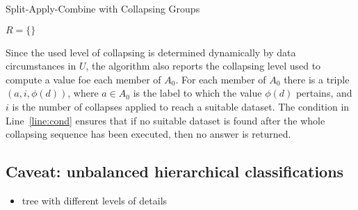\documentclass[11pt, fleqn]{article}
\begin{document}
%
\begin{algorithm}[H]
\caption{Split-Apply-Combine with Collapsing Groups}
\label{alg:saccg}


$R = \{\}$\;

\end{algorithm}
%
Since the used level of collapsing is determined dynamically by data
circumstances in $U$, the algorithm also reports the collapsing level used to
compute a value foe each member of $A_0$. For each member of $A_0$ there is a
triple $(a,i,\phi(d))$, where $a\in A_0$ is the label to which the value
$\phi(d)$ pertains, and $i$ is the number of collapses applied to reach a
suitable dataset. The condition in Line~\ref{line:cond} ensures that if no
suitable dataset is found after the whole collapsing sequence has been
executed, then no answer is returned.



\subsection{Caveat: unbalanced hierarchical classifications}
\begin{itemize}
\item tree with different levels of details
\end{itemize}
\end{document}
